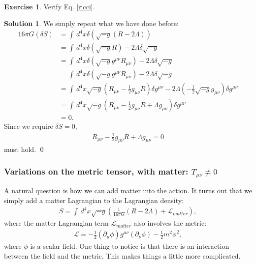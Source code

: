 \documentclass[a4paper,11pt]{article}
\numberwithin{equation}{section}
\theoremstyle{definition}
\newtheorem{exmp}{Exercise}[section]
\newtheorem{sln}{Solution}[section]
\newcommand{\p}{\partial}
\newcommand{\lag}{\mathcal{L}}
\newcommand{\nn}{\nonumber}
\newcommand{\f}[2]{\frac{#1}{#2}}
\newcommand{\lp}{\left(}
\newcommand{\rp}{\right)}
\begin{document}
\begin{exmp}
	Verify Eq. \eqref{ricci}.\\
	
	\begin{sln}
		We simply repeat what we have done before:
		\begin{align}
		16 \pi G (\delta S) &= \int \, d^4x \delta \lp \sqrt{-g}(R - 2\Lambda) \rp \nn\\
		&= \int \, d^4x \delta (\sqrt{-g} R) - 2\Lambda \delta \sqrt{-g} \nn\\
		&= \int \, d^4x \delta \lp\sqrt{-g} g^{\mu\nu}R_{\mu\nu}\rp- 2\Lambda \delta \sqrt{-g} \nn\\
		&= \int \, d^4x \delta \lp\sqrt{-g} g^{\mu\nu}R_{\mu\nu}\rp- 2\Lambda \delta \sqrt{-g} \nn\\
		&= \int \, d^4x \sqrt{-g} \lp R_{\mu\nu} - \f{1}{2}g_{\mu\nu}R \rp \delta g^{\mu\nu}- 2\Lambda \lp -\f{1}{2}\sqrt{-g} g_{\mu\nu} \rp \delta g^{\mu\nu} \nn\\
		&= \int \, d^4x \sqrt{-g}\lp R_{\mu\nu} - \f{1}{2}g_{\mu\nu}R + \Lambda g_{\mu\nu} \rp \delta g^{\mu\nu}\nn\\
		&= 0.
		\end{align}
		Since we require $\delta S = 0$,
		\begin{align}
		R_{\mu\nu} - \f{1}{2}g_{\mu\nu}R + \Lambda g_{\mu\nu} = 0
		\end{align}
		must hold. \qed \\
	\end{sln}
\end{exmp}

















\subsubsection{Variations on the metric tensor, with matter: $T_{\mu\nu} \neq 0$}

A natural question is how we can add matter into the action. It turns out that we simply add a matter Lagrangian to the Lagrangian density:
\begin{align}
S = \int\,d^4x \sqrt{-g}\lp \f{1}{16\pi G}(R - 2\Lambda) + \lag_{matter} \rp,
\end{align}
where the matter Lagrangian term $\lag_{matter}$ also involves the metric:
\begin{align}
\lag = -\f{1}{2}(\p_\mu\phi)g^{\mu\nu}(\p_\nu\phi) - \f{1}{2}m^2\phi^2,
\end{align}
where $\phi$ is a scalar field. One thing to notice is that there is an interaction between the field and the metric. This makes things a little more complicated. 
\end{document}

